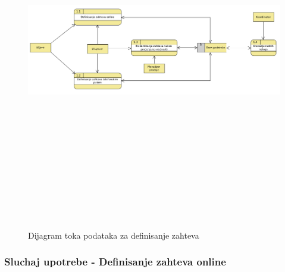 \documentclass[10 pt]{article}
\begin{document}
	\begin{figure}[H]
		\centering
		\includegraphics[width=15cm,height=15cm,keepaspectratio]{slike/DTPDefinisanjeZahteva.png}\\
		\caption{Dijagram toka podataka za definisanje zahteva}
	\end{figure}
	
	\subsubsection{Sluchaj upotrebe - Definisanje zahteva online}
	
\end{document}
